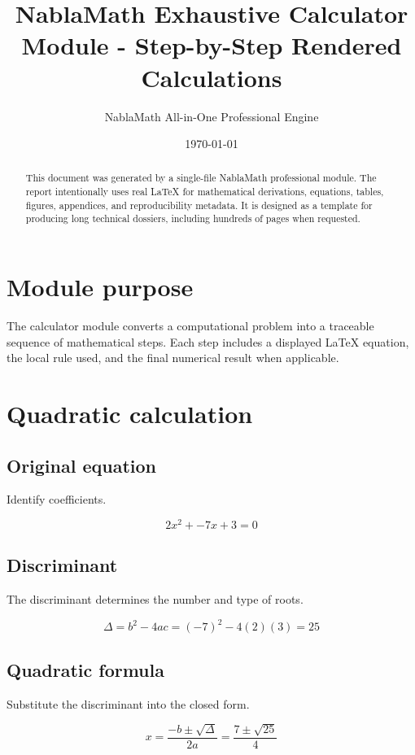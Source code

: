 \documentclass[11pt,a4paper]{article}
\title{NablaMath Exhaustive Calculator Module - Step-by-Step Rendered Calculations}
\author{NablaMath All-in-One Professional Engine}
\date{\today}
\begin{document}
\maketitle
\begin{abstract}
This document was generated by a single-file NablaMath professional module. The report intentionally uses real LaTeX for mathematical derivations, equations, tables, figures, appendices, and reproducibility metadata. It is designed as a template for producing long technical dossiers, including hundreds of pages when requested.
\end{abstract}
\tableofcontents
\newpage
\section{Module purpose}
The calculator module converts a computational problem into a traceable sequence of mathematical steps. Each step includes a displayed LaTeX equation, the local rule used, and the final numerical result when applicable.

\section{Quadratic calculation}

\subsection{Original equation}
Identify coefficients.
\begin{derivationbox}
\[
2x^2 + -7x + 3 = 0
\]
\end{derivationbox}

\subsection{Discriminant}
The discriminant determines the number and type of roots.
\begin{derivationbox}
\[
\Delta=b^2-4ac=(-7)^2-4(2)(3)=25
\]
\end{derivationbox}

\subsection{Quadratic formula}
Substitute the discriminant into the closed form.
\begin{derivationbox}
\[
x=\frac{-b\pm\sqrt{\Delta}}{2a}=\frac{7\pm\sqrt{25}}{4}
\]
\end{derivationbox}
\end{document}
